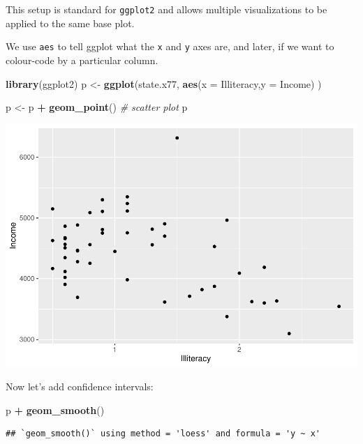 \documentclass[
]{book}
\newenvironment{Shaded}{\begin{snugshade}}{\end{snugshade}}
\newcommand{\AttributeTok}[1]{\textcolor[rgb]{0.13,0.29,0.53}{#1}}
\newcommand{\CommentTok}[1]{\textcolor[rgb]{0.56,0.35,0.01}{\textit{#1}}}
\newcommand{\FunctionTok}[1]{\textcolor[rgb]{0.13,0.29,0.53}{\textbf{#1}}}
\newcommand{\NormalTok}[1]{#1}
\newcommand{\OtherTok}[1]{\textcolor[rgb]{0.56,0.35,0.01}{#1}}
\newcommand{\SpecialCharTok}[1]{\textcolor[rgb]{0.81,0.36,0.00}{\textbf{#1}}}
\begin{document}
This setup is standard for \texttt{ggplot2} and allows multiple visualizations to be applied to the same base plot.

We use \texttt{aes} to tell ggplot what the \texttt{x} and \texttt{y} axes are, and later, if we want to colour-code by a particular column.

\begin{Shaded}
\begin{Highlighting}[]
\FunctionTok{library}\NormalTok{(ggplot2)}
\NormalTok{p }\OtherTok{\textless{}{-}} \FunctionTok{ggplot}\NormalTok{(state.x77, }
    \FunctionTok{aes}\NormalTok{(}\AttributeTok{x =}\NormalTok{ Illiteracy,}\AttributeTok{y =}\NormalTok{ Income)}
\NormalTok{    )}

\NormalTok{p }\OtherTok{\textless{}{-}}\NormalTok{ p }\SpecialCharTok{+} \FunctionTok{geom\_point}\NormalTok{() }\CommentTok{\# scatter plot}
\NormalTok{p}
\end{Highlighting}
\end{Shaded}

\includegraphics{_main_files/figure-latex/load-states-data-1.pdf}

Now let's add confidence intervals:

\begin{Shaded}
\begin{Highlighting}[]
\NormalTok{p }\SpecialCharTok{+} \FunctionTok{geom\_smooth}\NormalTok{()}
\end{Highlighting}
\end{Shaded}

\begin{verbatim}
## `geom_smooth()` using method = 'loess' and formula = 'y ~ x'
\end{verbatim}
\end{document}
